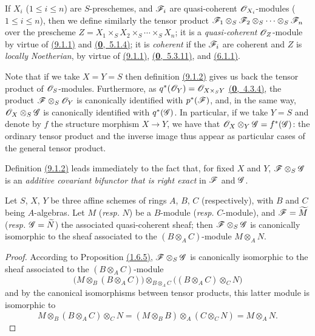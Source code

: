 If $X_i$ ($1\leqslant i\leqslant n$) are $S$-preschemes, and $\mathscr{F}_i$ are quasi-coherent
$\mathscr{O}_{X_i}$-modules ($1\leqslant i\leqslant n$), then we define similarly the tensor product
$\mathscr{F}_1\otimes_S\mathscr{F}_2\otimes_S\cdots\otimes_S\mathscr{F}_n$ over the
prescheme $Z=X_1\times_S X_2\times_S\cdots\times_S X_n$; it is a
{\it quasi-coherent} $\mathscr{O}_Z$-module by virtue of \hyperref[prop-1.9.1.1]{(9.1.1)} and
\hyperref[env-0.5.1.4]{(\textbf{0},~5.1.4)}; it is {\it coherent} if the $\mathscr{F}_i$ are coherent and
$Z$ is {\it locally Noetherian}, by virtue of \hyperref[prop-1.9.1.1]{(9.1.1)},
\hyperref[env-0.5.3.11]{(\textbf{0},~5.3.11)}, and \hyperref[env-1.6.1.1]{(6.1.1)}.

Note that if we take $X=Y=S$ then definition \hyperref[defn-1.9.1.2]{(9.1.2)} gives us back the tensor
product of $\mathscr{O}_S$-modules. Furthermore, as $q^*(\mathscr{O}_Y)=\mathscr{O}_{X\times_S Y}$
\hyperref[env-0.4.3.4]{(\textbf{0},~4.3.4)}, the product $\mathscr{F}\otimes_S\mathscr{O}_Y$ is canonically
identified with $p^*(\mathscr{F})$, and, in the same way,
$\mathscr{O}_X\otimes_S\mathscr{G}$ is canonically identified with $q^*(\mathscr{G})$. In
particular, if we take $Y=S$ and denote by $f$ the structure morphism $X\to Y$,
we have that $\mathscr{O}_X\otimes_Y\mathscr{G}=f^*(\mathscr{G})$: the ordinary tensor
product and the inverse image thus appear as particular cases of the general
tensor product.

Definition \hyperref[defn-1.9.1.2]{(9.1.2)} leads immediately to the fact that, for fixed $X$ and
$Y$, $\mathscr{F}\otimes_S\mathscr{G}$ is an {\it additive covariant bifunctor that
is right exact} in $\mathscr{F}$ and $\mathscr{G}$.

\begin{prop}[9.1.3]
\label{prop-1.9.1.3}
Let $S$, $X$, $Y$ be three affine schemes of rings
$A$, $B$, $C$ (respectively), with $B$ and $C$ being $A$-algebras. Let $M$
({\it resp.} $N$) be a $B$-module ({\it resp.} $C$-module), and
$\mathscr{F}=\widetilde{M}$ ({\it resp.} $\mathscr{G}=\widetilde{N}$) the
associated quasi-coherent sheaf; then $\mathscr{F}\otimes_S\mathscr{G}$ is
canonically isomorphic to the sheaf associated to the $(B\otimes_A C)$-module
$M\otimes_A N$.
\end{prop}

\begin{proof}
\label{proof-prop-1.9.1.3}
According to Proposition \hyperref[prop-1.1.6.5]{(1.6.5)}, $\mathscr{F}\otimes_S\mathscr{G}$
is canonically isomorphic to the sheaf associated to the $(B\otimes_A C)$-module
\[
  \big(M\otimes_B(B\otimes_A C)\big)\otimes_{B\otimes_A C}\big((B\otimes_A C)\otimes_C N\big)
\]
and by the canonical isomorphisms between tensor
products, this latter module is isomorphic to
\[
  M\otimes_B(B\otimes_A C)\otimes_C N=(M\otimes_B B)\otimes_A(C\otimes_C N)=M\otimes_A N.
\]
\end{proof}

